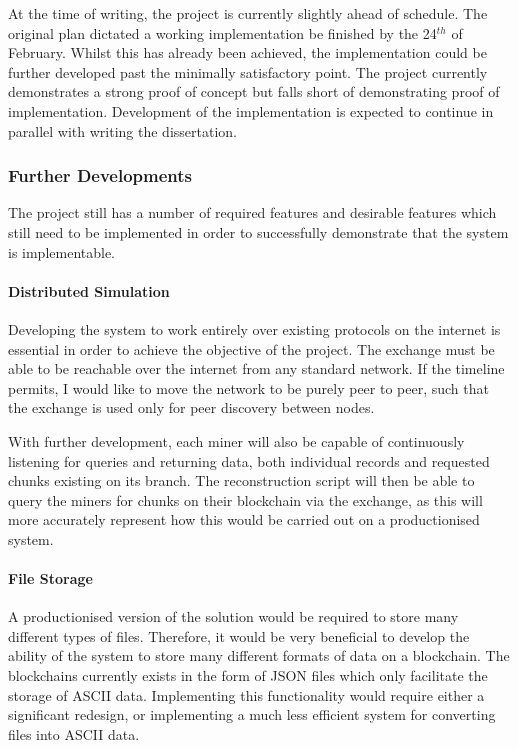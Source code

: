 \documentclass[]{article}
\let\oldparagraph\paragraph
\renewcommand{\paragraph}[1]{\oldparagraph{#1}\mbox{}}
\begin{document}
At the time of writing, the project is currently slightly ahead of
schedule. The original plan dictated a working implementation be
finished by the 24\(^{th}\) of February. Whilst this has already been
achieved, the implementation could be further developed past the
minimally satisfactory point. The project currently demonstrates a
strong proof of concept but falls short of demonstrating proof of
implementation. Development of the implementation is expected to
continue in parallel with writing the dissertation.

\hypertarget{header-n118}{%
\subsubsection{Further Developments}\label{header-n118}}

The project still has a number of required features and desirable
features which still need to be implemented in order to successfully
demonstrate that the system is implementable.

\hypertarget{header-n120}{%
\paragraph{Distributed Simulation}\label{header-n120}}

Developing the system to work entirely over existing protocols on the
internet is essential in order to achieve the objective of the project.
The exchange must be able to be reachable over the internet from any
standard network. If the timeline permits, I would like to move the
network to be purely peer to peer, such that the exchange is used only
for peer discovery between nodes.

With further development, each miner will also be capable of
continuously listening for queries and returning data, both individual
records and requested chunks existing on its branch. The reconstruction
script will then be able to query the miners for chunks on their
blockchain via the exchange, as this will more accurately represent how
this would be carried out on a productionised system.

\hypertarget{header-n125}{%
\paragraph{File Storage}\label{header-n125}}

A productionised version of the solution would be required to store many
different types of files. Therefore, it would be very beneficial to
develop the ability of the system to store many different formats of
data on a blockchain. The blockchains currently exists in the form of
JSON files which only facilitate the storage of ASCII data. Implementing
this functionality would require either a significant redesign, or
implementing a much less efficient system for converting files into
ASCII data.
\end{document}
